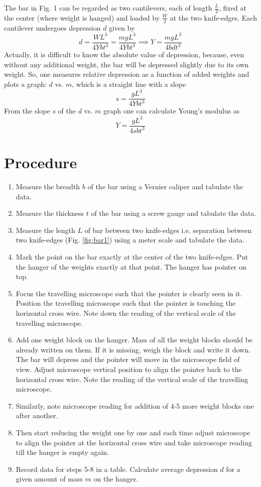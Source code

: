 \documentclass[11pt]{scrartcl}
\begin{document}
The bar in Fig. 1 can be regarded as two cantilevers, each of length \(\frac{L}{2}\),
fixed at the center (where weight is hanged) and loaded by \(\frac{W}{2}\) at the
two knife-edges. Each cantilever undergoes depression \(d\) given by 
\begin{equation}
    d = \frac{WL^3}{4Ybt^3} = \frac{mgL^3}{4Ybt^3} \implies Y = \frac{mgL^3}{4bdt^3}
\end{equation}
Actually, it is difficult to know the absolute value of depression, because, even without any additional weight, the bar will be
depressed slightly due to its own weight. So, one measures relative depression as a function of added weights and plots a graph:
\(d\) vs. \(m\), which is a straight line with a slope
\[s = \frac{gL^3}{4Ybt^3}\]
From the slope \(s\) of the \(d\) vs. \(m\) graph one can calculate Young's
modulus as
\begin{equation}
    \boxed{Y = \frac{gL^3}{4sbt^3}}
    \label{eqn:main}
\end{equation}

\section{Procedure}
\begin{enumerate}
    \item Measure the breadth \(b\) of the bar using a Vernier caliper and tabulate the data.
    \item Measure the thickness \(t\) of the bar using a screw gauge and tabulate the data.
    \item Measure the length \(L\) of bar between two knife-edges i.e. separation between two knife-edges (Fig. \ref{fig:bar1}) using a meter scale and tabulate the data.
    \item Mark the point on the bar exactly at the center of the two knife-edges. Put the hanger of the weights exactly at that point. The hanger has pointer on top.
    \item Focus the travelling microscope such that the pointer is clearly seen in it. Position the travelling microscope such that the pointer is touching the horizontal cross wire. Note down the reading of the vertical scale of the travelling microscope.
    \item Add one weight block on the hanger. Mass of all the weight blocks should be already written on them. If it is missing, weigh the block and write it down. The bar will depress and the pointer will move in the microscope field of view. Adjust microscope vertical position to align the pointer back to the horizontal cross wire. Note the reading of the vertical scale of the travelling microscope. 
    \item Similarly, note microscope reading for addition of 4-5 more weight blocks one after another.
    \item Then start reducing the weight one by one and each time adjust microscope to align the pointer at the horizontal cross wire and take microscope reading till the hanger is empty again. 
    \item Record data for steps 5-8 in a table. Calculate average depression \(d\) for a given amount of mass \(m\) on the hanger.
\end{enumerate}
\end{document}
